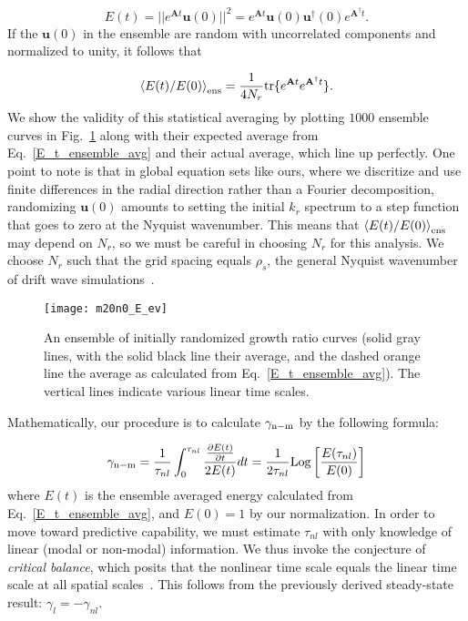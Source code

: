 \documentclass[letter,scriptaddress,twocolumn, prl,showkeys]{revtex4}
\def\beq{\begin{equation}}
\def\eeq{\end{equation}}
\newcommand{\pdiff}[2]{\frac{\partial#1}{\partial#2}}
\begin{document}
\beq
\label{E_t_from_u0}
E(t) = ||e^{\mathbf{A} t} \mathbf{u}(0)||^2 = e^{\mathbf{A} t} \mathbf{u}(0) \mathbf{u}^{\dagger}(0) e^{\mathbf{A}^{\dagger}t}.
\eeq
If the $\mathbf{u}(0)$ in the ensemble are random with uncorrelated components and normalized to unity, it follows that~\cite{camargo1998}

\beq
\label{E_t_ensemble_avg}
\left< E(t)/E(0) \right>_{{\rm{ens}}} = \frac{1}{4 N_r} {\rm{tr}} \{ e^{\mathbf{A} t} e^{\mathbf{A}^{\dagger}t} \}.
\eeq
We show the validity of this statistical averaging by plotting $1000$ ensemble curves in Fig.~\ref{m20n0_E_ev} along with their expected average from Eq.~\ref{E_t_ensemble_avg} and their actual average,
which line up perfectly.
One point to note is that in global equation sets like ours, where we discritize and use finite differences in the radial direction rather than a Fourier decomposition, randomizing $\mathbf{u}(0)$
amounts to setting the initial $k_r$ spectrum to a step function that goes to zero at the Nyquist wavenumber. This means that $\left< E(t)/E(0) \right>_{{\rm{ens}}}$ may depend on $N_r$, so we must be careful in
choosing $N_r$ for this analysis. We choose $N_r$ such that the grid spacing equals $\rho_s$, the general Nyquist wavenumber of drift wave simulations~\cite{scott1992}.

\begin{figure}
\centerline{\texttt{[image: m20n0\_E\_ev]}}
\caption{An ensemble of initially randomized growth ratio curves (solid gray lines, with the solid black line their average, and the dashed orange line the average as calculated from Eq.~\ref{E_t_ensemble_avg}).
The vertical lines indicate various linear time scales.}
\label{m20n0_E_ev}
\end{figure}

Mathematically, our procedure is to calculate $\gamma_{\rm{n-m}}$ by the following formula:

\beq
\label{gamma_l_calc}
\gamma_{\rm{n-m}} = \frac{1}{\tau_{nl}} \int_0^{\tau_{nl}} \frac{\pdiff{E(t)}{t}}{2 E(t)} dt = \frac{1}{2 \tau_{nl}} {\rm{Log}} \left[ \frac{E(\tau_{nl})}{E(0)}\right]
\eeq
where $E(t)$ is the ensemble averaged energy calculated from Eq.~\ref{E_t_ensemble_avg}, and $E(0) = 1$ by our normalization.
In order to move toward predictive capability, we must estimate $\tau_{nl}$ with only knowledge of linear (modal or non-modal) information. 
We thus invoke the conjecture of \emph{critical balance}, which posits that the nonlinear time scale equals the linear time scale at all spatial scales~\cite{schekochihin2012}. This follows from 
the previously derived steady-state result: $\gamma_l = - \gamma_{nl}$. 
\end{document}
